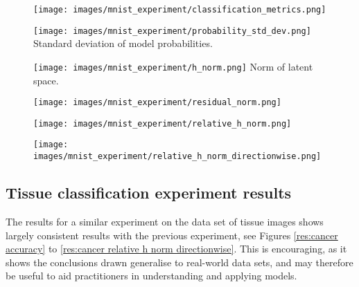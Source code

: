 \documentclass{article}
\begin{document}
\begin{figure}[h]
\centering
\begin{minipage}{.25\textwidth}
  \centering
  \texttt{[image: images/mnist\_experiment/classification\_metrics.png]}
  \label{res:mnist accuracy}
\end{minipage}%
\hspace{.05\textwidth}
\begin{minipage}{.25\textwidth}
  \centering
  \texttt{[image: images/mnist\_experiment/probability\_std\_dev.png]}
  {Standard deviation of model probabilities.}
  \label{res:mnist prob std}
\end{minipage}
\begin{minipage}{.25\textwidth}
  \centering
  \texttt{[image: images/mnist\_experiment/h\_norm.png]}
  {Norm of latent space.}
  \label{res:mnist h norm}
\end{minipage}
\end{figure}


\begin{figure}[h]
\centering
\begin{minipage}{.25\textwidth}
  \centering
  \texttt{[image: images/mnist\_experiment/residual\_norm.png]}
  \label{res:mnist r norm}
\end{minipage}%
\hspace{.05\textwidth}
\begin{minipage}{.25\textwidth}
  \centering
  \texttt{[image: images/mnist\_experiment/relative\_h\_norm.png]}
  \label{res:mnist relative h norm}
\end{minipage}
\begin{minipage}{.25\textwidth}
  \centering
  \texttt{[image: images/mnist\_experiment/relative\_h\_norm\_directionwise.png]}
  \label{res:mnist relative h norm directionwise}
\end{minipage}
\end{figure}





\subsection{Tissue classification experiment results}
\label{sec:cancer results}
The results for a similar experiment on the data set of tissue images shows largely consistent results with the previous experiment, see Figures \ref{res:cancer accuracy} to \ref{res:cancer relative h norm directionwise}. This is encouraging, as it shows the conclusions drawn generalise to real-world data sets, and may therefore be useful to aid practitioners in understanding and applying models.
\end{document}
